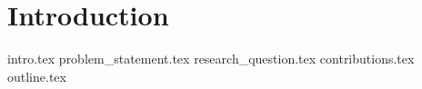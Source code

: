 \chapter{Introduction}
\label{ch:1}
{intro.tex}
{problem_statement.tex}
{research_question.tex}
{contributions.tex}
{outline.tex}
